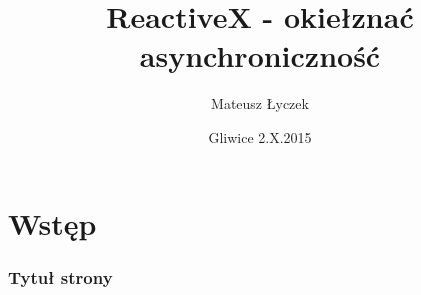 \documentclass[24pt]{beamer}
\title[ReactiveX]{ReactiveX - okiełznać asynchroniczność}
\date{Gliwice 2.X.2015}
\author{Mateusz Łyczek}
\begin{document}
    \begin{frame}[plain]
        \titlepage
    \end{frame}

    \section{Wstęp}

    \begin{frame}
        \frametitle{Tytuł strony}
    \end{frame}

    \endpage
\end{document}
